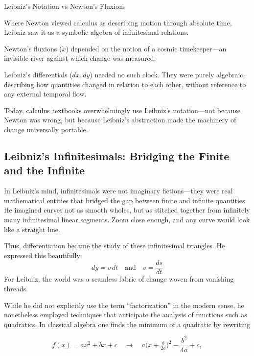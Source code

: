 \begin{HistoricalSidebar}{Leibniz’s Notation vs Newton’s Fluxions}

  Where Newton viewed calculus as describing motion through absolute time, Leibniz saw it as a symbolic algebra of infinitesimal relations.

  \medskip

  Newton's fluxions (\( \dot{x} \)) depended on the notion of a cosmic timekeeper—an invisible river against which change was measured.

  \medskip

  Leibniz’s differentials (\( dx, dy \)) needed no such clock. They were purely algebraic, describing how quantities changed in relation to each other, without reference to any external temporal flow.

  \medskip

  Today, calculus textbooks overwhelmingly use Leibniz’s notation—not because Newton was wrong, but because Leibniz’s abstraction made the machinery of change universally portable.

\end{HistoricalSidebar}





\subsection{Leibniz’s Infinitesimals: Bridging the Finite and the Infinite}

In Leibniz’s mind, infinitesimals were not imaginary fictions—they were real mathematical entities that bridged the gap between finite and infinite quantities. He imagined curves not as smooth wholes, but as stitched together from infinitely many infinitesimal linear segments. Zoom close enough, and any curve would look like a straight line.

Thus, differentiation became the study of these infinitesimal triangles.  He expressed this beautifully:
\[
dy = v\,dt
\quad \text{and} \quad
v = \frac{ds}{dt}
\]
For Leibniz, the world was a seamless fabric of change woven from vanishing threads.

While he did not explicitly use the term “factorization” in the modern sense, he nonetheless employed techniques that anticipate the analysis of functions such as quadratics.  In classical algebra one finds the minimum of a quadratic by rewriting

\[
f(x) = ax^2 + bx + c
\quad\longrightarrow\quad
a\bigl(x + \tfrac{b}{2a}\bigr)^2 - \frac{b^2}{4a} + c,
\]

